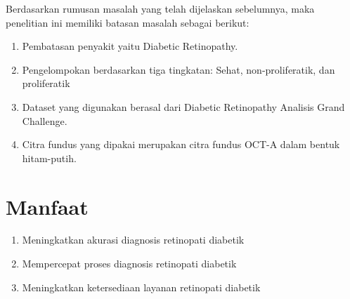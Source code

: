 Berdasarkan rumusan masalah yang telah dijelaskan sebelumnya, maka penelitian ini memiliki batasan masalah sebagai berikut:
\begin{enumerate}
	\item Pembatasan penyakit yaitu Diabetic Retinopathy.
	\item Pengelompokan berdasarkan tiga tingkatan: Sehat, non-proliferatik, dan proliferatik
	\item Dataset yang digunakan berasal dari Diabetic Retinopathy Analisis Grand Challenge.
	\item Citra fundus yang dipakai merupakan citra fundus OCT-A dalam bentuk hitam-putih.
\end{enumerate}

\section{Manfaat}
\label{sec:Manfaat}

\begin{enumerate}
	\item Meningkatkan akurasi diagnosis retinopati diabetik
	\item Mempercepat proses diagnosis retinopati diabetik
	\item Meningkatkan ketersediaan layanan retinopati diabetik
\end{enumerate}
